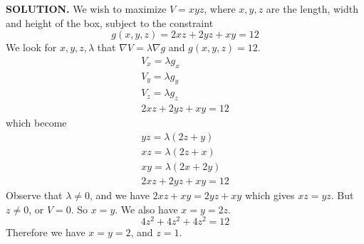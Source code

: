 \documentclass{article}
\begin{document}
{\selectfont \textbf{\textcolor{blue5}{SOLUTION.}}}  We wish to maximize $V = xyz$, where $x,y,z$ are the length, width and height of the box, subject to the constraint 
\[g(x,y,z) = 2xz + 2yz + xy = 12\]
We look for $x,y,z, \lambda $ that $\nabla V = \lambda \nabla g$ and $g(x,y,z) = 12$. 
\begin{align*}
  V_x = \lambda g_x \\
  V_y = \lambda g_y \\ 
  V_z = \lambda g_z \\
  2xz + 2yz + xy = 12 
\end{align*}
which become 
\begin{align*}
  yz = \lambda (2z + y) \\
  xz = \lambda (2z + x) \\
  xy = \lambda (2x + 2y) \\
  2xz + 2yz + xy = 12 
\end{align*}
Observe that $\lambda \ne 0$, and we have $2xz + xy = 2yz + xy$ which gives $xz = yz$. But $z \ne 0 $, or $V = 0 $. So $x = y$. We also have $x = y = 2z$.
\[4 z^2 + 4 z^2 + 4 z^2 = 12 \]
Therefore we have $x = y =2$, and $z = 1$.
\end{document}
